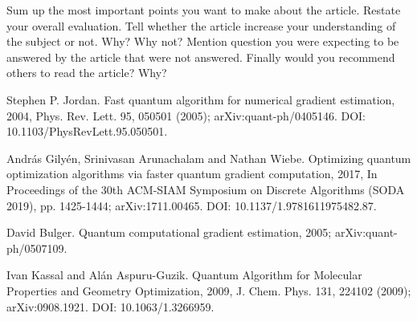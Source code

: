 \documentclass{article}
\begin{document}
Sum up the most important points you want to make about the article. Restate your overall evaluation. Tell whether the article increase your understanding of the subject or not. Why? Why not? Mention question you were expecting to be answered by the article that were not answered. Finally would you recommend others to read the article? Why?




%
%
\begin{thebibliography}{5}

  Stephen P. Jordan.
  \newblock Fast quantum algorithm for numerical gradient estimation, 2004,
  \newblock Phys. Rev. Lett. 95, 050501 (2005);
  \newblock arXiv:quant-ph/0405146.
  \newblock DOI: 10.1103/PhysRevLett.95.050501.

  András Gilyén, Srinivasan Arunachalam and Nathan Wiebe.
  \newblock Optimizing quantum optimization algorithms via faster quantum gradient computation, 2017,
  \newblock In Proceedings of the 30th ACM-SIAM Symposium on Discrete
  Algorithms (SODA 2019), pp. 1425-1444;
  \newblock arXiv:1711.00465.
  \newblock DOI: 10.1137/1.9781611975482.87.


  David Bulger.
  \newblock Quantum computational gradient estimation, 2005;
  \newblock arXiv:quant-ph/0507109.

  Ivan Kassal and Alán Aspuru-Guzik.
  \newblock Quantum Algorithm for Molecular Properties and Geometry Optimization, 2009,
  \newblock J. Chem. Phys. 131, 224102 (2009);
  \newblock arXiv:0908.1921.
  \newblock DOI: 10.1063/1.3266959.


\end{thebibliography}
\end{document}
